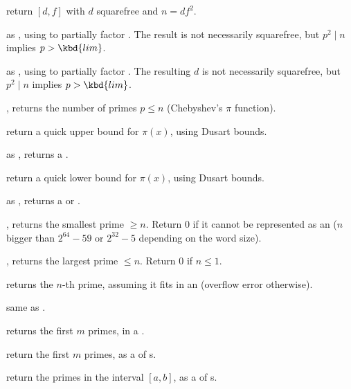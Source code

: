  return $[d,f]$ with $d$ squarefree and $n = df^2$.

 as , using
 to partially factor . The result is not
necessarily squarefree, but $p^2 \mid n$ implies $p > \kbd{lim}$.

 as , using
 to partially factor . The resulting $d$ is not
necessarily squarefree, but $p^2 \mid n$ implies $p > \kbd{lim}$.



, returns the number of primes $p\leq n$
(Chebyshev's $\pi$ function).

 return a quick upper bound for
$\pi(x)$, using Dusart bounds.

 as , returns a
.

 return a quick lower bound for
$\pi(x)$, using Dusart bounds.

 as , returns
a  or .


, returns the smallest prime $\geq n$. Return
$0$ if it cannot be represented as an  ($n$ bigger than $2^{64} -
59$ or $2^{32} - 5$ depending on the word size).

, returns the largest prime $\leq n$. Return
$0$ if $n\leq 1$.

 returns the $n$-th prime, assuming it fits in an
 (overflow error otherwise).

 same as .

 returns the first $m$ primes, in a
.

 return the first $m$ primes, as a  of
s.

 return the primes in the interval
$[a,b]$, as a  of s.

